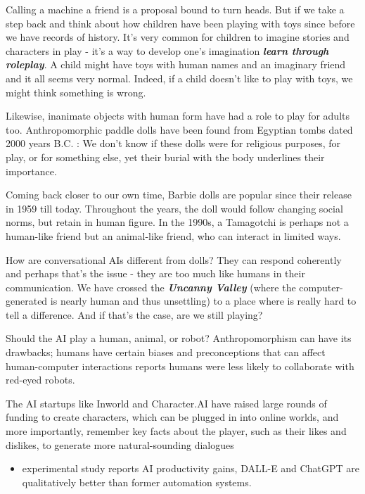 \documentclass[
  letterpaper,
  DIV=11,
  numbers=noendperiod]{scrartcl}
\providecommand{\tightlist}{%
  \setlength{\itemsep}{0pt}\setlength{\parskip}{0pt}}\usepackage{longtable,booktabs,array}
\begin{document}
Calling a machine a friend is a proposal bound to turn heads. But if we
take a step back and think about how children have been playing with
toys since before we have records of history. It's very common for
children to imagine stories and characters in play - it's a way to
develop one's imagination \textbf{\emph{learn through roleplay}}. A
child might have toys with human names and an imaginary friend and it
all seems very normal. Indeed, if a child doesn't like to play with
toys, we might think something is wrong.

Likewise, inanimate objects with human form have had a role to play for
adults too. Anthropomorphic paddle dolls have been found from Egyptian
tombs dated 2000 years B.C. \citet{PaddleDollMiddle2023}: We don't know
if these dolls were for religious purposes, for play, or for something
else, yet their burial with the body underlines their importance.

Coming back closer to our own time, Barbie dolls are popular since their
release in 1959 till today. Throughout the years, the doll would follow
changing social norms, but retain in human figure. In the 1990s, a
Tamagotchi is perhaps not a human-like friend but an animal-like friend,
who can interact in limited ways.

How are conversational AIs different from dolls? They can respond
coherently and perhaps that's the issue - they are too much like humans
in their communication. We have crossed the \textbf{\emph{Uncanny
Valley}} (where the computer-generated is nearly human and thus
unsettling) to a place where is really hard to tell a difference. And if
that's the case, are we still playing?

Should the AI play a human, animal, or robot? Anthropomorphism can have
its drawbacks; humans have certain biases and preconceptions that can
affect human-computer interactions \citep{pilacinskiRobotEyesDon2023}
reports humans were less likely to collaborate with red-eyed robots.

The AI startups like Inworld and Character.AI have raised large rounds
of funding to create characters, which can be plugged in into online
worlds, and more importantly, remember key facts about the player, such
as their likes and dislikes, to generate more natural-sounding dialogues
\citet{wiggersInworldGenerativeAI2023}

\begin{itemize}
\tightlist
\item
  \citet{lenharoChatGPTGivesExtra2023} experimental study reports AI
  productivity gains, DALL-E and ChatGPT are qualitatively better than
  former automation systems.
\end{itemize}
\end{document}
